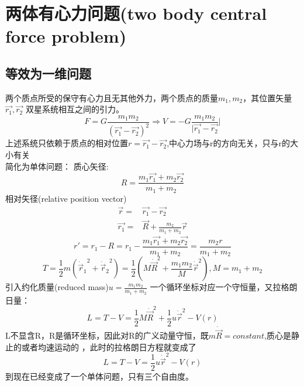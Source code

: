 \documentclass[UTF8,10pt]{article}
\begin{document}
\section{两体有心力问题(two body central force problem)}
\subsection{等效为一维问题}
两个质点所受的保守有心力且无其他外力，两个质点的质量$m_1,m_2$，其位置矢量$\vec{r_1},\vec{r_2}$
双星系统相互之间的引力。
\[F=G\frac{m_1m_2}{(\vec{r_1}-\vec{r_2})^2}\Rightarrow V=-G\frac{m_1m_2}{|\vec{r_1}-\vec{r_2}}|\]
上述系统只依赖于质点的相对位置$r=\vec{r_1}-\vec{r_2}$,中心力场与r的方向无关，只与r的大小有关
\\简化为单体问题：
质心矢径:$$R=\frac{m_1\vec{r_1}+m_2\vec{r_2}}{m_1+m_2}$$
相对矢径(relative position vector)
\begin{align*}
    \vec{r}=   & \vec{r_1}-\vec{r_2}                \\
    \vec{r_1}= & \vec{R}+\frac{m_2}{m_1+m_2}\vec{r}
\end{align*}
\[r'=r_1-R=r_1-\frac{m_1\vec{r_1}+m_2\vec{r_2}}{m_1+m_2}=\frac{m_2 r}{m_1+m_2}\]
$$
    T=\frac{1}{2}m({\dot{\vec{r}}_1}^2+{\dot{\vec{r}}_2}^2)=\frac{1}{2}\left( M\dot{\vec{R}}^2+\frac{m_1m_2}{M}\dot{\vec{r}}^2 \right) ,M=m_1+m_2
$$
引入约化质量(reduced mass)$u=\frac{m_1m_2}{m_1+m_2}$
一个循环坐标对应一个守恒量，又拉格朗日量：
$$
    L=T-V=\frac{1}{2}M\dot{\vec{R}}^2+\frac{1}{2}u\dot{\vec{r}}^2-V\left( r \right)
$$
L不显含R，R是循环坐标，因此对R的广义动量守恒，既$m\dot{\vec{R}}=constant$,质心是静止的或者均速运动的
，此时的拉格朗日方程就变成了
$$
    L=T-V=\frac{1}{2}u\dot{\vec{r}}^2-V\left( r \right)
$$
到现在已经变成了一个单体问题，只有三个自由度。
\end{document}
